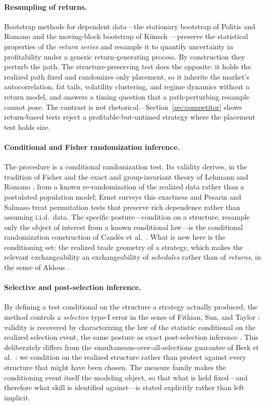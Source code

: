 \paragraph{Resampling of returns.} Bootstrap methods for dependent data---the stationary
bootstrap of Politis and Romano \cite{politisromano1994} and the moving-block bootstrap of
K\"unsch \cite{Kunsch1989}---preserve the statistical properties of the \emph{return
series} and resample it to quantify uncertainty in profitability under a generic
return-generating process. By construction they perturb the path. The structure-preserving
test does the opposite: it holds the realized path fixed and randomizes only placement, so
it inherits the market's autocorrelation, fat tails, volatility clustering, and regime
dynamics without a return model, and answers a timing question that a path-perturbing
resample cannot pose. The contrast is not rhetorical---Section~\ref{sec:competitor} shows
return-based tests reject a profitable-but-untimed strategy where the placement test holds
size.

\paragraph{Conditional and Fisher randomization inference.} The procedure is a conditional
randomization test. Its validity derives, in the tradition of Fisher \cite{Fisher1935}
and the exact and group-invariant theory of Lehmann and Romano \cite{LehmannRomano2005},
from a known re-randomization of the realized data rather than a postulated population
model; Ernst \cite{Ernst2004} surveys this exactness and Pesarin and Salmaso
\cite{PesarinSalmaso2010} treat permutation tests that preserve rich dependence rather
than assuming i.i.d.\ data. The specific posture---condition on a structure, resample only
the object of interest from a known conditional law---is the conditional randomization
construction of Cand\`es et al.\ \cite{Candes2018}. What is new here is the conditioning
set: the realized trade geometry of a strategy, which makes the relevant exchangeability
an exchangeability of \emph{schedules} rather than of \emph{returns}, in the sense of
Aldous \cite{Aldous1985}.

\paragraph{Selective and post-selection inference.} By defining a test conditional on the
structure a strategy actually produced, the method controls a \emph{selective} type-I
error in the sense of Fithian, Sun, and Taylor \cite{FithianSunTaylor2014}: validity is
recovered by characterizing the law of the statistic conditional on the realized selection
event, the same posture as exact post-selection inference \cite{LeeSunSunTaylor2016}. This
deliberately differs from the simultaneous-over-all-selections guarantee of Berk et al.\
\cite{BerkBrownBujaZhangZhao2013}: we condition on the realized structure rather than
protect against every structure that might have been chosen. The measure family makes the
conditioning event itself the modeling object, so that what is held fixed---and therefore
what skill is identified against---is stated explicitly rather than left implicit.

